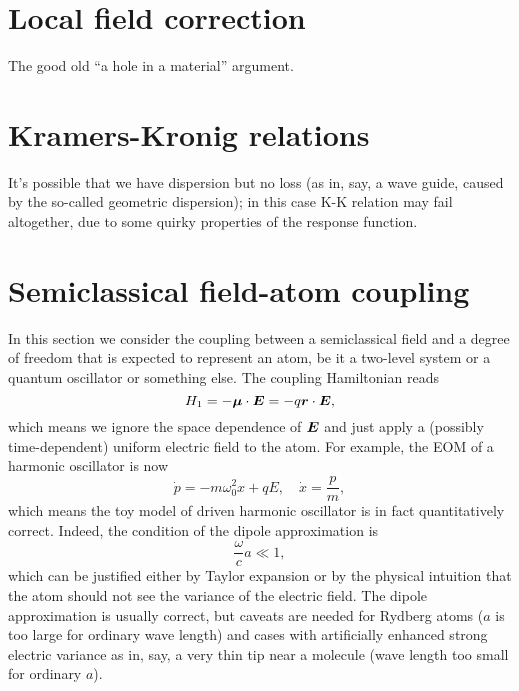 \documentclass[hyperref, a4paper]{article}
\begin{document}
\section{Local field correction}

The good old ``a hole in a material'' argument.

\section{Kramers-Kronig relations}

It's possible that we have dispersion but no loss 
(as in, say, a wave guide, 
caused by the so-called geometric dispersion); 
in this case K-K relation may fail altogether,
due to some quirky properties of the response function.

\section{Semiclassical field-atom coupling}

In this section we consider the coupling between 
a semiclassical field and a degree of freedom 
that is expected to represent an atom,
be it a two-level system or a quantum oscillator or something else.
The coupling Hamiltonian reads 
\begin{equation}
    H_1 = - \vb*{\mu} \cdot \vb*{E} = - q \vb*{r} \cdot \vb*{E},
\end{equation}
which means we ignore the space dependence of $\vb*{E}$
and just apply a (possibly time-dependent) uniform electric field to 
the atom.
For example, the EOM of a harmonic oscillator is now 
\begin{equation}
    \dot{p} = - m \omega_0^2 x + q E, \quad 
    \dot{x} = \frac{p}{m},
\end{equation}
which means the toy model of driven harmonic oscillator 
is in fact quantitatively correct.
Indeed, the condition of the dipole approximation is 
\begin{equation}
    \frac{\omega}{c} a \ll 1,
\end{equation}
which can be justified either by Taylor expansion 
or by the physical intuition that the atom should not see 
the variance of the electric field.
The dipole approximation is usually correct, 
but caveats are needed for Rydberg atoms
($a$ is too large for ordinary wave length)
and cases with artificially enhanced strong electric variance 
as in, say, a very thin tip near a molecule 
(wave length too small for ordinary $a$).
\end{document}
